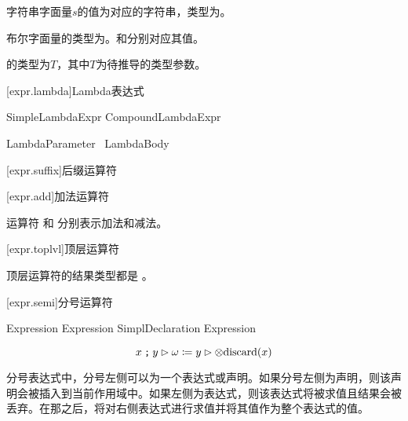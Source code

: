 \pnum
字符串字面量$s$的值为对应的字符串，类型为。

\pnum
布尔字面量的类型为。和分别对应其值。

\pnum
{}的类型为$T$，其中$T$为待推导的类型参数。

[expr.lambda]{Lambda表达式}

\begin{bnf}
 \br
    SimpleLambdaExpr \br
    CompoundLambdaExpr
\end{bnf}

\begin{bnf}
 \br
    LambdaParameter\bnfq\ \terminal{=>} LambdaBody
\end{bnf}

\begin{bnf}
 \br
\end{bnf}

[expr.suffix]{后缀运算符}

[expr.add]{加法运算符}

\pnum
运算符 \tcode{+} 和 \tcode{-} 分别表示加法和减法。

[expr.toplvl]{顶层运算符}

\pnum
顶层运算符的结果类型都是 。

[expr.semi]{分号运算符}

\begin{bnf}
\br
    Expression \terminal{;} Expression\br
    SimplDeclaration \terminal{;} Expression\br
\end{bnf}

$$ x \mathbin{\texttt{;}} y \rhd \omega \coloneqq y \rhd \otimes \mathrm{discard}(x)$$

\pnum
分号表达式中，分号左侧可以为一个表达式或声明。如果分号左侧为声明，则该声明会被插入到当前作用域中。如果左侧为表达式，则该表达式将被求值且结果会被丢弃。在那之后，将对右侧表达式进行求值并将其值作为整个表达式的值。
